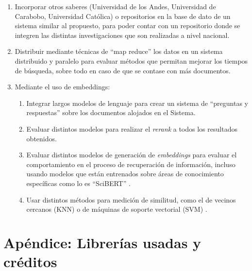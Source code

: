 \documentclass[
  12pt,
  openany]{book}
\begin{document}
\begin{enumerate}
\def\labelenumi{\arabic{enumi}.}
\item
  Incorporar otros saberes (Universidad de los Andes, Universidad de Carabobo, Universidad Católica) o repositorios en la base de dato de un sistema similar al propuesto, para poder contar con un repositorio donde se integren las distintas investigaciones que son realizadas a nivel nacional.
\item
  Distribuir mediante técnicas de ``map reduce'' los datos en un sistema distribuido y paralelo para evaluar métodos que permitan mejorar los tiempos de búsqueda, sobre todo en caso de que se contase con más documentos.
\item
  Mediante el uso de embeddings:

  \begin{enumerate}
  \def\labelenumii{\arabic{enumii}.}
  \item
    Integrar largos modelos de lenguaje para crear un sistema de ``preguntas y respuestas'' sobre los documentos alojados en el Sistema.
  \item
    Evaluar distintos modelos para realizar el \emph{rerank} a todos los resultados obtenidos.
  \item
    Evaluar distintos modelos de generación de \emph{embeddings} para evaluar el comportamiento en el proceso de recuperación de información, incluso usando modelos que están entrenados sobre áreas de conocimiento específicas como lo es ``SciBERT'' \citep{beltagy2019}.
  \item
    Usar distintos métodos para medición de similitud, como el de vecinos cercanos (KNN) \citep{annoy2023} o de máquinas de soporte vectorial (SVM) \citep{svm2023}.
  \end{enumerate}
\end{enumerate}

\hypertarget{apendicea}{%
\chapter{Apéndice: Librerías usadas y créditos}\label{apendicea}}
\end{document}
